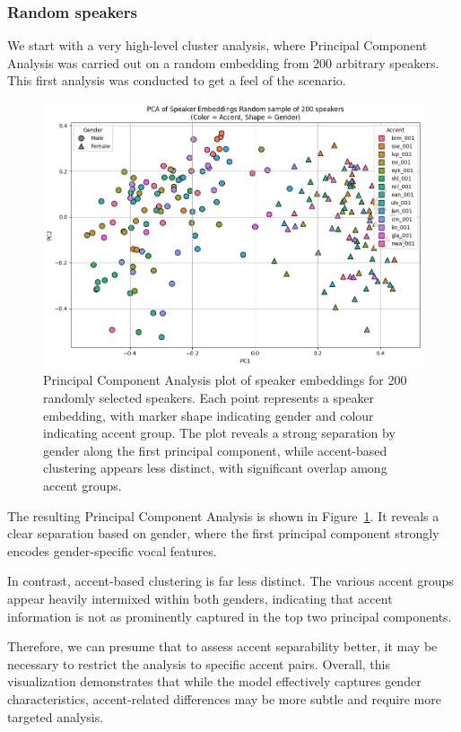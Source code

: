 \documentclass[conference]{IEEEtran}
\begin{document}
\subsubsection{Random speakers}


We start with a very high-level cluster analysis, where Principal Component Analysis was carried out on a random embedding from 200 arbitrary speakers. This first analysis was conducted to get a feel of the scenario.

\begin{figure}[H]
	\centering
	\includegraphics[width=0.7\linewidth]{img/img-cluster-all}
	\caption{Principal Component Analysis plot of speaker embeddings for 200 randomly selected speakers. Each point represents a speaker embedding, with marker shape indicating gender and colour indicating accent group. The plot reveals a strong separation by gender along the first principal component, while accent-based clustering appears less distinct, with significant overlap among accent groups.}
	\label{fig:img-cluster-all}
\end{figure}


The resulting Principal Component Analysis is shown in Figure~\ref{fig:img-cluster-all}. It reveals a clear separation based on gender, where the first principal component strongly encodes gender-specific vocal features. 

In contrast, accent-based clustering is far less distinct. The various accent groups appear heavily intermixed within both genders, indicating that accent information is not as prominently captured in the top two principal components. 


Therefore, we can presume that to assess accent separability better, it may be necessary to restrict the analysis to specific accent pairs. Overall, this visualization demonstrates that while the model effectively captures gender characteristics, accent-related differences may be more subtle and require more targeted analysis.
\end{document}
